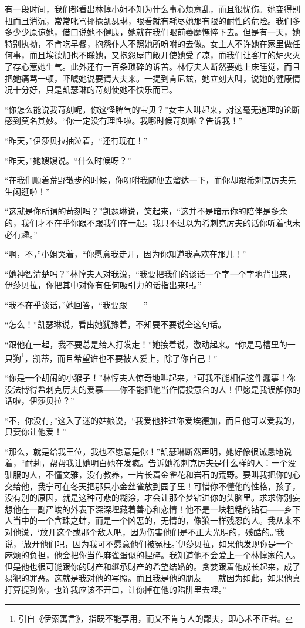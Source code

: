 \par 有一段时间，我们都看出林惇小姐不知为什么事心烦意乱，而且很忧伤。她变得别扭而且消沉，常常叱骂揶揄凯瑟琳，眼看就有耗尽她那有限的耐性的危险。我们多多少少原谅她，借口说她不健康，她就在我们眼前萎靡憔悴下去。但是有一天，她特别执拗，不肯吃早餐，抱怨仆人不照她所吩咐的去做。女主人不许她在家里做任何事，而且埃德加也不睬她，又抱怨屋门敞开使她受了凉，而我们让客厅的炉火灭了存心惹她生气。此外还有一百条琐碎的诉苦。林惇夫人断然要她上床睡觉，而且把她痛骂一顿，吓唬她说要请大夫来。一提到肯尼兹，她立刻大叫，说她的健康情况十分好，只是凯瑟琳的苛刻使她不快乐而已。
\par “你怎么能说我苛刻呢，你这怪脾气的宝贝？”女主人叫起来，对这毫无道理的论断感到莫名其妙。“你一定没有理性啦。我哪时候苛刻啦？告诉我！”
\par “昨天，”伊莎贝拉抽泣着，“还有现在！”
\par “昨天，”她嫂嫂说。“什么时候呀？”
\par “在我们顺着荒野散步的时候，你吩咐我随便去溜达一下，而你却跟希刺克厉夫先生闲逛啦！”
\par “这就是你所谓的苛刻吗？”凯瑟琳说，笑起来，“这并不是暗示你的陪伴是多余的，我们才不在乎你跟不跟我们在一起。我只不过以为希刺克厉夫的话你听着也未必有趣。”
\par “啊，不，”小姐哭着，“你愿意我走开，因为你知道我喜欢在那儿！”
\par “她神智清楚吗？”林惇夫人对我说，“我要把我们的谈话一个字一个字地背出来，伊莎贝拉，你把其中对你有任何吸引力的话指出来吧。”
\par “我不在乎谈话，”她回答，“我要跟——”
\par “怎么！”凯瑟琳说，看出她犹豫着，不知要不要说全这句话。
\par “跟他在一起，我不要总是给人打发走！”她接着说，激动起来。“你是马槽里的一只狗\footnote{引自《伊索寓言》，指既不能享用，而又不肯与人的鄙夫，即心术不正者。}，凯蒂，而且希望谁也不要被人爱上，除了你自己！”
\par “你是一个胡闹的小猴子！”林惇夫人惊奇地叫起来，“可我不能相信这件蠢事！你没法博得希刺克厉夫的爱慕——你不能把他当作情投意合的人！但愿是我误解你的话啦，伊莎贝拉？”
\par “不，你没有，”这入了迷的姑娘说，“我爱他胜过你爱埃德加，而且他可以爱我的，只要你让他爱！”
\par “那么，就是给我王位，我也不愿意是你！”凯瑟琳断然声明，她好像很诚恳地说着，“耐莉，帮帮我让她明白她在发疯。告诉她希刺克厉夫是什么样的人：一个没驯服的人，不懂文雅，没有教养，一片长着金雀花和岩石的荒野。要叫我把你的心交给他，我宁可在冬天把那只小金丝雀放到园子里！可惜你不懂他的性格，孩子，没有别的原因，就是这种可悲的糊涂，才会让那个梦钻进你的头脑里。求求你别妄想他在一副严峻的外表下深深埋藏着善心和恋情！他不是一块粗糙的钻石——乡下人当中的一个含珠之蚌，而是一个凶恶的，无情的，像狼一样残忍的人。我从来不对他说，‘放开这个或那个敌人吧，因为伤害他们是不正大光明的，残酷的。’我说，‘放开他们吧，因为我可不愿意他们被冤枉。’伊莎贝拉，如果他发现你是一个麻烦的负担，他会把你当作麻雀蛋似的捏碎。我知道他不会爱上一个林惇家的人。但是他也很可能跟你的财产和继承财产的希望结婚的。贪婪跟着他成长起来，成了易犯的罪恶。这就是我对他的写照。而且我是他的朋友——就因为如此，如果他真打算提到你，也许我应该不开口，让你掉在他的陷阱里去哩。”

